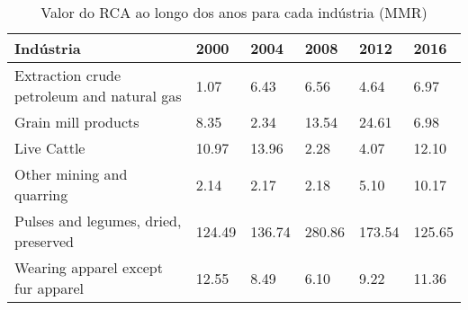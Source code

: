 \begin{table}
\centering
\caption{Valor do RCA ao longo dos anos para cada indústria (MMR)}
\begin{tabular}{p{6cm}p{1.5cm}p{1.5cm}p{1.5cm}p{1.5cm}p{1.5cm}}
\toprule
                                 Indústria &   2000 &   2004 &   2008 &   2012 &   2016 \\
\midrule
Extraction crude petroleum and natural gas &   1.07 &   6.43 &   6.56 &   4.64 &   6.97 \\
                       Grain mill products &   8.35 &   2.34 &  13.54 &  24.61 &   6.98 \\
                               Live Cattle &  10.97 &  13.96 &   2.28 &   4.07 &  12.10 \\
                 Other mining and quarring &   2.14 &   2.17 &   2.18 &   5.10 &  10.17 \\
      Pulses and legumes, dried, preserved & 124.49 & 136.74 & 280.86 & 173.54 & 125.65 \\
        Wearing apparel except fur apparel &  12.55 &   8.49 &   6.10 &   9.22 &  11.36 \\
\bottomrule
\end{tabular}
\end{table}
